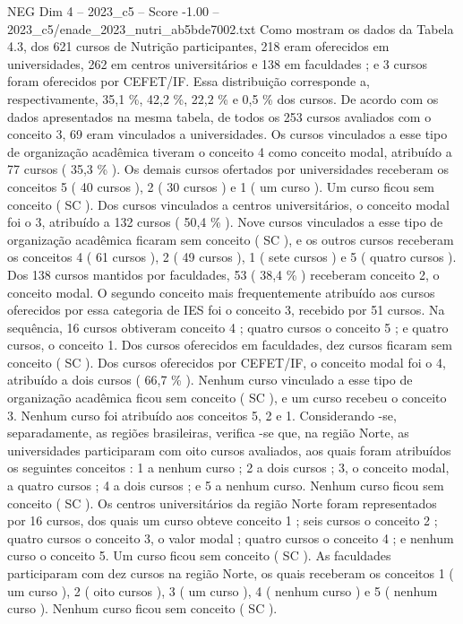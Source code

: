 \begin{textsample}{NEG Dim 4 – 2023\_c5 – Score -1.00 – 2023\_c5/enade\_2023\_nutri\_ab5bde7002.txt}
Como mostram os dados da Tabela 4.3, dos 621 cursos de Nutrição participantes, 218 eram oferecidos em universidades, 262 em centros universitários e 138 em faculdades ; e 3 cursos foram oferecidos por CEFET/IF.
Essa distribuição corresponde a, respectivamente, 35,1 \%, 42,2 \%, 22,2 \% e 0,5 \% dos cursos.
De acordo com os dados apresentados na mesma tabela, de todos os 253 cursos avaliados com o conceito 3, 69 eram vinculados a universidades.
Os cursos vinculados a esse tipo de organização acadêmica tiveram o conceito 4 como conceito modal, atribuído a 77 cursos ( 35,3 \% ).
Os demais cursos ofertados por universidades receberam os conceitos 5 ( 40 cursos ), 2 ( 30 cursos ) e 1 ( um curso ).
Um curso ficou sem conceito ( SC ).
Dos cursos vinculados a centros universitários, o conceito modal foi o 3, atribuído a 132 cursos ( 50,4 \% ).
Nove cursos vinculados a esse tipo de organização acadêmica ficaram sem conceito ( SC ), e os outros cursos receberam os conceitos 4 ( 61 cursos ), 2 ( 49 cursos ), 1 ( sete cursos ) e 5 ( quatro cursos ).
Dos 138 cursos mantidos por faculdades, 53 ( 38,4 \% ) receberam conceito 2, o conceito modal.
O segundo conceito mais frequentemente atribuído aos cursos oferecidos por essa categoria de IES foi o conceito 3, recebido por 51 cursos.
Na sequência, 16 cursos obtiveram conceito 4 ; quatro cursos o conceito 5 ; e quatro cursos, o conceito 1.
Dos cursos oferecidos em faculdades, dez cursos ficaram sem conceito ( SC ).
Dos cursos oferecidos por CEFET/IF, o conceito modal foi o 4, atribuído a dois cursos ( 66,7 \% ).
Nenhum curso vinculado a esse tipo de organização acadêmica ficou sem conceito ( SC ), e um curso recebeu o conceito 3.
Nenhum curso foi atribuído aos conceitos 5, 2 e 1.
Considerando -se, separadamente, as regiões brasileiras, verifica -se que, na região Norte, as universidades participaram com oito cursos avaliados, aos quais foram atribuídos os seguintes conceitos : 1 a nenhum curso ; 2 a dois cursos ; 3, o conceito modal, a quatro cursos ; 4 a dois cursos ; e 5 a nenhum curso.
Nenhum curso ficou sem conceito ( SC ).
Os centros universitários da região Norte foram representados por 16 cursos, dos quais um curso obteve conceito 1 ; seis cursos o conceito 2 ; quatro cursos o conceito 3, o valor modal ; quatro cursos o conceito 4 ; e nenhum curso o conceito 5.
Um curso ficou sem conceito ( SC ).
As faculdades participaram com dez cursos na região Norte, os quais receberam os conceitos 1 ( um curso ), 2 ( oito cursos ), 3 ( um curso ), 4 ( nenhum curso ) e 5 ( nenhum curso ).
Nenhum curso ficou sem conceito ( SC ).

\end{textsample}
